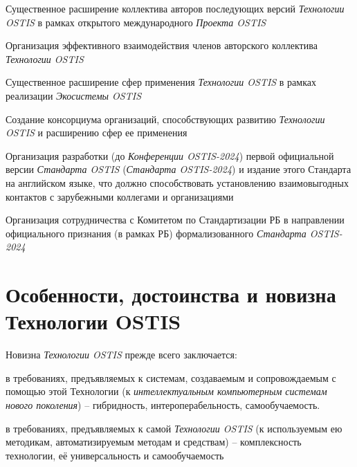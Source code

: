 \begin{textitemize}
	\item
	Существенное расширение коллектива авторов последующих версий \textit{Технологии OSTIS} в рамках открытого международного \textit{Проекта OSTIS}
	\item
	Организация эффективного взаимодействия членов авторского коллектива \textit{Технологии OSTIS}
	\item
	Существенное расширение сфер применения \textit{Технологии OSTIS} в рамках реализации \textit{Экосистемы OSTIS}
	\item
	Создание консорциума организаций, способствующих развитию \textit{Технологии OSTIS} и расширению сфер ее применения
	\item
	Организация разработки (до \textit{Конференции OSTIS-2024}) первой официальной версии  \textit{Стандарта OSTIS} (\textit{Стандарта OSTIS-2024}) и издание этого Стандарта на английском языке, что должно способствовать установлению взаимовыгодных контактов с зарубежными коллегами и организациями
	\item
	Организация сотрудничества с Комитетом по Стандартизации РБ в направлении официального признания (в рамках РБ) формализованного \textit{Стандарта OSTIS-2024}
\end{textitemize}

\section*{Особенности, достоинства и новизна Технологии OSTIS}
\label{concl_novelty}

Новизна \textit{Технологии OSTIS} прежде всего заключается:
\begin{textitemize}
	\item в требованиях, предъявляемых к системам, создаваемым и сопровождаемым с помощью этой Технологии (к \textit{интеллектуальным компьютерным системам нового поколения}) -- гибридность, интероперабельность, самообучаемость.
	\item в требованиях, предъявляемых к самой \textit{Технологии OSTIS} (к используемым ею методикам, автоматизируемым методам и средствам) -- комплексность технологии, её универсальность и самообучаемость
\end{textitemize}

